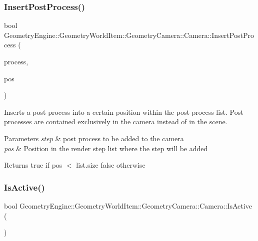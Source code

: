 \subsubsection{\texorpdfstring{InsertPostProcess()}{InsertPostProcess()}}
{\footnotesize\ttfamily bool Geometry\+Engine\+::\+Geometry\+World\+Item\+::\+Geometry\+Camera\+::\+Camera\+::\+Insert\+Post\+Process (\begin{DoxyParamCaption}\item[{const \mbox{\hyperlink{class_geometry_engine_1_1_geometry_post_process_1_1_post_process}{Geometry\+Post\+Process\+::\+Post\+Process}} \&}]{process,  }\item[{unsigned int}]{pos }\end{DoxyParamCaption})\hspace{0.3cm}{\ttfamily [virtual]}}

Inserts a post process into a certain position within the post process list. Post processes are contained exclusively in the camera instead of in the scene. 
\begin{DoxyParams}{Parameters}
{\em step} & post process to be added to the camera \\
\hline
{\em pos} & Position in the render step list where the step will be added \\
\hline
\end{DoxyParams}
\begin{DoxyReturn}{Returns}
true if pos $<$ list.\+size false otherwise 
\end{DoxyReturn}
\mbox{\label{class_geometry_engine_1_1_geometry_world_item_1_1_geometry_camera_1_1_camera_a045debd24966944cf641dcf8f0366c77}} 
\subsubsection{\texorpdfstring{IsActive()}{IsActive()}}
{\footnotesize\ttfamily bool Geometry\+Engine\+::\+Geometry\+World\+Item\+::\+Geometry\+Camera\+::\+Camera\+::\+Is\+Active (\begin{DoxyParamCaption}{ }\end{DoxyParamCaption})\hspace{0.3cm}{\ttfamily [inline]}}

